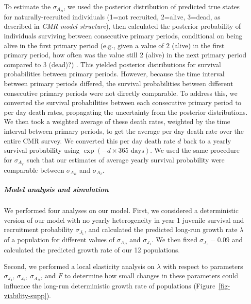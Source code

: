 \documentclass[9pt,twoside,lineno]{pnas-new}
\begin{document}
To estimate the \(\sigma_{A_R}\), we used the posterior distribution of
predicted true states for naturally-recruited individuals (1=not
recruited, 2=alive, 3=dead, as described in \emph{CMR model structure}),
then calculated the posterior probability of individuals surviving
between consecutive primary periods, conditional on being alive in the
first primary period (e.g., given a value of 2 (alive) in the first
primary period, how often was the value still 2 (alive) in the next
primary period compared to 3 (dead)?) . This yielded posterior
distributions for survival probabilities between primary periods.
However, because the time interval between primary periods differed, the
survival probabilities between different consecutive primary periods
were not directly comparable. To address this, we converted the survival
probabilities between each consecutive primary period to per day death
rates, propagating the uncertainty from the posterior distributions. We
then took a weighted average of these death rates, weighted by the time
interval between primary periods, to get the average per day death rate
over the entire CMR survey. We converted this per day death rate \(d\)
back to a yearly survival probability using
\(\exp(-d \times 365 \text{ days})\). We used the same procedure for
\(\sigma_{A_T}\) such that our estimates of average yearly survival
probability were comparable between \(\sigma_{A_R}\) and
\(\sigma_{A_T}\).

\hypertarget{model-analysis-and-simulation}{%
\subparagraph{Model analysis and
simulation}\label{model-analysis-and-simulation}}

We performed four analyses on our model. First, we considered a
deterministic version of our model with no yearly heterogeneity in year
1 juvenile survival and recruitment probability \(\sigma_{J_1}\), and
calculated the predicted long-run growth rate \(\lambda\) of a
population for different values of \(\sigma_{A_R}\) and
\(\sigma_{J_1}\). We then fixed \(\sigma_{J_1} = 0.09\) and calculated
the predicted growth rate of our 12 populations.

Second, we performed a local elasticity analysis on \(\lambda\) with
respect to parameters \(\sigma_{J_1}\), \(\sigma_{J_2}\),
\(\sigma_{A_R}\), and \(F\) to determine how small changes in these
parameters could influence the long-run deterministic growth rate of
populations (Figure~\ref{fig-viability-supp}).
\end{document}
